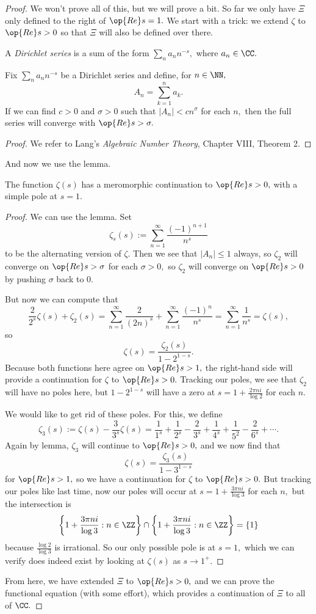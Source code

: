 \begin{proof}
	We won't prove all of this, but we will prove a bit. So far we only have $\Xi$ only defined to the right of $\op{Re}s=1.$ We start with a trick: we extend $\zeta$ to $\op{Re}s>0$ so that $\Xi$ will also be defined over there.
	\begin{definition}
		A \textit{Dirichlet series} is a sum of the form $\sum_na_nn^{-s},$ where $a_n\in\CC.$
	\end{definition}
	\begin{lemma}
		Fix $\sum_na_nn^{-s}$ be a Dirichlet series and define, for $n\in\NN,$
		\[A_n=\sum_{k=1}^na_k.\]
		If we can find $c>0$ and $\sigma>0$ such that $|A_n|<cn^\sigma$ for each $n,$ then the full series will converge with $\op{Re}s>\sigma.$
	\end{lemma}
	\begin{proof}
		We refer to Lang's \textit{Algebraic Number Theory}, Chapter VIII, Theorem 2.
	\end{proof}
	And now we use the lemma.
	\begin{prop}
		The function $\zeta(s)$ has a meromorphic continuation to $\op{Re}s>0,$ with a simple pole at $s=1.$
	\end{prop}
	\begin{proof}
		We can use the lemma. Set
		\[\zeta_s(s):=\sum_{n=1}^\infty\frac{(-1)^{n+1}}{n^s}\]
		to be the alternating version of $\zeta.$ Then we see that $|A_n|\le1$ always, so $\zeta_2$ will converge on $\op{Re}s>\sigma$ for each $\sigma>0,$ so $\zeta_2$ will converge on $\op{Re}s>0$ by pushing $\sigma$ back to $0.$

		But now we can compute that
		\[\frac2{2^s}\zeta(s)+\zeta_2(s)=\sum_{n=1}^\infty\frac{2}{(2n)^s}+\sum_{n=1}^\infty\frac{(-1)^n}{n^s}=\sum_{n=1}^\infty\frac1{n^s}=\zeta(s),\]
		so
		\[\zeta(s)=\frac{\zeta_2(s)}{1-2^{1-s}}.\]
		Because both functions here agree on $\op{Re}s>1,$ the right-hand side will provide a continuation for $\zeta$ to $\op{Re}s>0.$	Tracking our poles, we see that $\zeta_2$ will have no poles here, but $1-2^{1-s}$ will have a zero at $s=1+\frac{2\pi ni}{\log2}$ for each $n.$

		We would like to get rid of these poles. For this, we define
		\[\zeta_3(s):=\zeta(s)-\frac3{3^s}\zeta(s)=\frac1{1^s}+\frac1{2^s}-\frac{2}{3^s}+\frac1{4^s}+\frac1{5^2}-\frac{2}{6^s}+\cdots.\]
		Again by lemma, $\zeta_3$ will continue to $\op{Re}s>0,$ and we now find that
		\[\zeta(s)=\frac{\zeta_3(s)}{1-3^{1-s}}\]
		for $\op{Re}s>1,$ so we have a continuation for $\zeta$ to $\op{Re}s>0.$ But tracking our poles like last time, now our poles will occur at $s=1+\frac{3\pi ni}{\log3}$ for each $n,$ but the intersection is
		\[\left\{1+\frac{3\pi ni}{\log3}:n\in\ZZ\right\}\cap\left\{1+\frac{3\pi ni}{\log3}:n\in\ZZ\right\}=\{1\}\]
		because $\frac{\log2}{\log3}$ is irrational. So our only possible pole is at $s=1,$ which we can verify does indeed exist by looking at $\zeta(s)$ as $s\to1^+.$
	\end{proof}
	From here, we have extended $\Xi$ to $\op{Re}s>0,$ and we can prove the functional equation (with some effort), which provides a continuation of $\Xi$ to all of $\CC.$
\end{proof}

